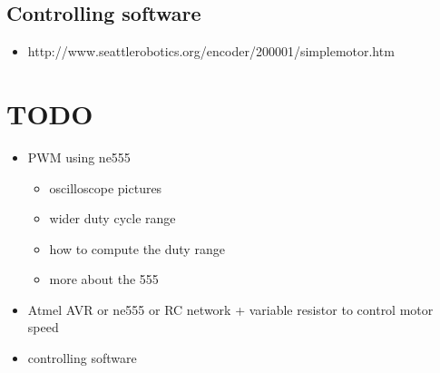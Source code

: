 \documentclass[12pt]{article}
\begin{document}
\subsection{Controlling software}
\begin{itemize}
  \item http://www.seattlerobotics.org/encoder/200001/simplemotor.htm
\end{itemize}


\section{TODO}

\begin{itemize}
\item PWM using ne555
\begin{itemize}
  \item oscilloscope pictures
  \item wider duty cycle range
  \item how to compute the duty range
  \item more about the 555
\end{itemize}
\item Atmel AVR or ne555 or RC network + variable resistor to control motor speed
\item controlling software 
\end{itemize}
\end{document}
